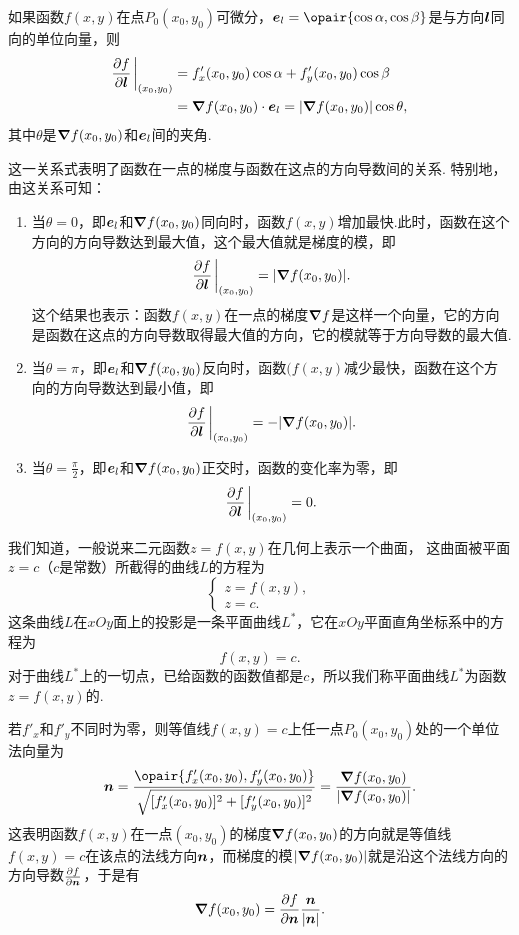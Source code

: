 \begin{theorem}\label{theorem:多元函数微分法.方向导数与梯度的关系}
如果函数\(f(x,y)\)在点\(P_0(x_0,y_0)\)可微分，\(\mat{e}_l=\opair{\cos\alpha,\cos\beta}\)是与方向\(\boldsymbol{l}\)同向的单位向量，则\begin{equation}
\begin{split}
\pdv{f}{\mat{l}}\eval_{(x_0,y_0)}
&= f'_x(x_0,y_0) \cos\alpha + f'_y(x_0,y_0) \cos\beta \\
&= \grad{f}(x_0,y_0) \cdot \mat{e}_l
= \abs{\grad{f}(x_0,y_0)} \cos\theta,
\end{split}
\end{equation}其中\(\theta\)是\(\grad{f}(x_0,y_0)\)和\(\boldsymbol{e}_l\)间的夹角.
\end{theorem}
这一关系式表明了函数在一点的梯度与函数在这点的方向导数间的关系.
特别地，由这关系可知：
\begin{enumerate}
\item 当\(\theta=0\)，即\(\boldsymbol{e}_l\)和\(\grad{f}(x_0,y_0)\)同向时，函数\(f(x,y)\)增加最快.此时，函数在这个方向的方向导数达到最大值，这个最大值就是梯度的模，即\[
\pdv{f}{\mat{l}}\eval_{(x_0,y_0)} = \abs{\grad{f}(x_0,y_0)}.
\]这个结果也表示：函数\(f(x,y)\)在一点的梯度\(\grad{f}\)是这样一个向量，它的方向是函数在这点的方向导数取得最大值的方向，它的模就等于方向导数的最大值.

\item 当\(\theta=\pi\)，即\(\boldsymbol{e}_l\)和\(\grad{f}(x_0,y_0)\)反向时，函数\((f(x,y)\)减少最快，函数在这个方向的方向导数达到最小值，即\[
\pdv{f}{\mat{l}}\eval_{(x_0,y_0)} = -\abs{\grad{f}(x_0,y_0)}.
\]

\item 当\(\theta=\frac{\pi}{2}\)，即\(\boldsymbol{e}_l\)和\(\grad{f}(x_0,y_0)\)正交时，函数的变化率为零，即\[
\pdv{f}{\mat{l}}\eval_{(x_0,y_0)} = 0.
\]
\end{enumerate}

我们知道，一般说来二元函数\(z = f(x,y)\)在几何上表示一个曲面，
这曲面被平面\(z = c\)（\(c\)是常数）所截得的曲线\(L\)的方程为\[
\left\{ \begin{array}{l}
z = f(x,y), \\
z = c.
\end{array} \right.
\]这条曲线\(L\)在\(xOy\)面上的投影是一条平面曲线\(L^*\)，它在\(xOy\)平面直角坐标系中的方程为\[
f(x,y) = c.
\]对于曲线\(L^*\)上的一切点，已给函数的函数值都是\(c\)，所以我们称平面曲线\(L^*\)为函数\(z = f(x,y)\)的.

若\(f'_x\)和\(f'_y\)不同时为零，则等值线\(f(x,y) = c\)上任一点\(P_0(x_0,y_0)\)处的一个单位法向量为\[
\mat{n}
= \frac{\opair{f'_x(x_0,y_0),f'_y(x_0,y_0)}}{\sqrt{[f'_x(x_0,y_0)]^2+[f'_y(x_0,y_0)]^2}}
= \frac{\grad f(x_0,y_0)}{\abs{\grad f(x_0,y_0)}}.
\]
这表明函数\(f(x,y)\)在一点\((x_0,y_0)\)的梯度\(\grad f(x_0,y_0)\)的方向就是等值线\(f(x,y) = c\)在该点的法线方向\(\boldsymbol{n}\)，而梯度的模\(\abs{\grad f(x_0,y_0)}\)就是沿这个法线方向的方向导数\(\pdv{f}{\boldsymbol{n}}\)，于是有\[
\grad f(x_0,y_0) = \pdv{f}{\boldsymbol{n}} \frac{\boldsymbol{n}}{\abs{\boldsymbol{n}}}.
\]

